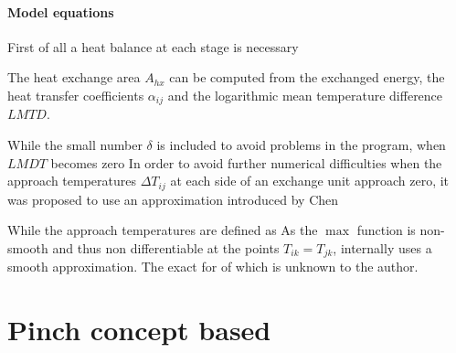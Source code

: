         \paragraph{Model equations}
    
        First of all a heat balance at each stage is necessary
    
        The heat exchange area $A_{hx}$ can be computed from the exchanged energy, the heat transfer coefficients $\alpha_{ij}$
        and the logarithmic mean temperature difference $LMTD$.
    
        While the small number $\delta$ is included to avoid problems in the program, when $LMDT$ becomes zero
        In order to avoid further numerical difficulties when the approach temperatures $\Delta T_{ij}$ at each side of an exchange
        unit approach zero, it was proposed to use an approximation introduced by Chen \cite{Chen.1987}
    
        While the approach temperatures are defined as
        As the $\max$ function is non-smooth and thus non differentiable at the points $T_{ik} = T_{jk}$, \gproms internally uses a smooth
        approximation. The exact for of which is unknown to the author.
        
    \section{Pinch concept based}
